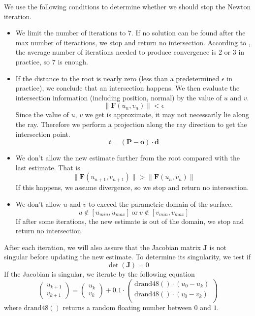 \documentclass[acmtog]{acmart}
\begin{document}
We use the following conditions to determine whether we should stop the Newton iteration. 

\begin{itemize}
	\item We limit the number of iterations to $7$. If no solution can be found after the max number of iteractions, we stop and return no intersection. According to \cite{}, the average number of iterations needed to produce convergence is 2 or 3 in practice, so $7$ is enough.
	
	\item If the distance to the root is nearly zero (less than a predetermined $\epsilon$ in practice), we conclude that an intersection happens. We then evaluate the intersection information (including position, normal) by the value of $u$ and $v$.
	\[
		\| \mathbf{F}(u_n, v_n) \| < \epsilon	
	\]
	Since the value of $u$, $v$ we get is approximate, it may not necessarily lie along the ray. Therefore we perform a projection along the ray direction to get the intersection point. \[
		t = (\mathbf{P} - \mathbf{o}) \cdot \mathbf{d}	
	\]

	\item We don't allow the new estimate further from the root compared with the last estimate. That is \[
		\| \mathbf{F}(u_{n+1}, v_{n+1}) \| >
		\| \mathbf{F}(u_{n}, v_{n}) \|
	\] 
	If this happens, we assume divergence, so we stop and return no intersection.

	\item We don't allow $u$ and $v$ to exceed the parametric domain of the surface. \[
		u \notin [u_{min}, u_{max}] \mathrm{\ or\ } v \notin [v_{min}, v_{max}]	
	\]
	If after some iterations, the new estimate is out of the domain, we stop and return no intersection.
\end{itemize}

After each iteration, we will also assure that the Jacobian matrix $\mathbf{J}$ is not singular before updating the new estimate. To determine its singularity, we test if \[
	\det(\mathbf{J}) = 0	
\]
If the Jacobian is singular, we iterate by the following equation
\[
	\left(\begin{matrix}
		u_{k+1}\\v_{k+1}
	\end{matrix}\right)	= 
	\left(\begin{matrix}
		u_{k}\\v_{k}
	\end{matrix}\right) + 0.1 \cdot \left(\begin{matrix}
		\mathrm{drand48}() \cdot (u_0 - u_k)\\
		\mathrm{drand48}() \cdot (v_0 - v_k)\\
	\end{matrix}\right)
\] where $\mathrm{drand48()}$ returns a random floating number between $0$ and $1$.
\end{document}
